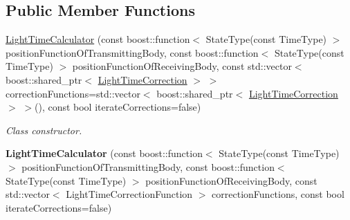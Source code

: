 \subsection*{Public Member Functions}
\begin{DoxyCompactItemize}
\item 
\hyperlink{classtudat_1_1observation__models_1_1LightTimeCalculator_a5b9f4a7828a0f833a7aa758e036caec2}{Light\+Time\+Calculator} (const boost\+::function$<$ State\+Type(const Time\+Type) $>$ position\+Function\+Of\+Transmitting\+Body, const boost\+::function$<$ State\+Type(const Time\+Type) $>$ position\+Function\+Of\+Receiving\+Body, const std\+::vector$<$ boost\+::shared\+\_\+ptr$<$ \hyperlink{classtudat_1_1observation__models_1_1LightTimeCorrection}{Light\+Time\+Correction} $>$ $>$ correction\+Functions=std\+::vector$<$ boost\+::shared\+\_\+ptr$<$ \hyperlink{classtudat_1_1observation__models_1_1LightTimeCorrection}{Light\+Time\+Correction} $>$ $>$(), const bool iterate\+Corrections=false)
\begin{DoxyCompactList}\small\item\em Class constructor. \end{DoxyCompactList}\item 
{\bfseries Light\+Time\+Calculator} (const boost\+::function$<$ State\+Type(const Time\+Type) $>$ position\+Function\+Of\+Transmitting\+Body, const boost\+::function$<$ State\+Type(const Time\+Type) $>$ position\+Function\+Of\+Receiving\+Body, const std\+::vector$<$ Light\+Time\+Correction\+Function $>$ correction\+Functions, const bool iterate\+Corrections=false)\hypertarget{classtudat_1_1observation__models_1_1LightTimeCalculator_af94da0e8329d528ca233ed16216ace4a}{}\label{classtudat_1_1observation__models_1_1LightTimeCalculator_af94da0e8329d528ca233ed16216ace4a}


\end{DoxyCompactItemize}
